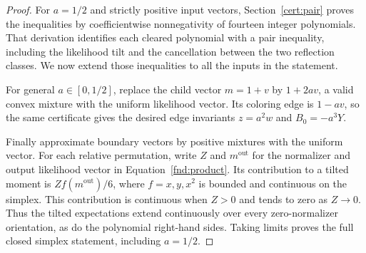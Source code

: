 \begin{proof}
For $a=1/2$ and strictly positive input vectors,
Section~\ref{cert:pair} proves the inequalities by coefficientwise
nonnegativity of fourteen integer polynomials.  That derivation identifies
each cleared polynomial with a pair inequality, including the likelihood
tilt and the cancellation between the two reflection classes.
We now extend those inequalities to all the inputs in the statement.

For general $a\in[0,1/2]$, replace the child vector $m=1+v$
by $1+2av$, a valid convex mixture with the uniform likelihood vector.
Its coloring edge is $1-av$, so the same certificate gives the desired
edge invariants $z=a^2w$ and $B_0=-a^3Y$.

Finally approximate boundary vectors by positive mixtures with the
uniform vector.  For each relative permutation, write $Z$ and
$m^{\mathrm{out}}$ for the normalizer and output likelihood vector
in Equation~\eqref{fnd:product}.  Its contribution to a tilted moment
is $Zf(m^{\mathrm{out}})/6$, where $f=x,y,x^2$ is bounded and
continuous on the simplex.  This contribution is continuous when
$Z>0$ and tends to zero as $Z\to0$.  Thus the tilted expectations extend
continuously over every zero-normalizer orientation, as do the
polynomial right-hand sides.  Taking limits proves the full closed
simplex statement, including $a=1/2$.
\end{proof}

